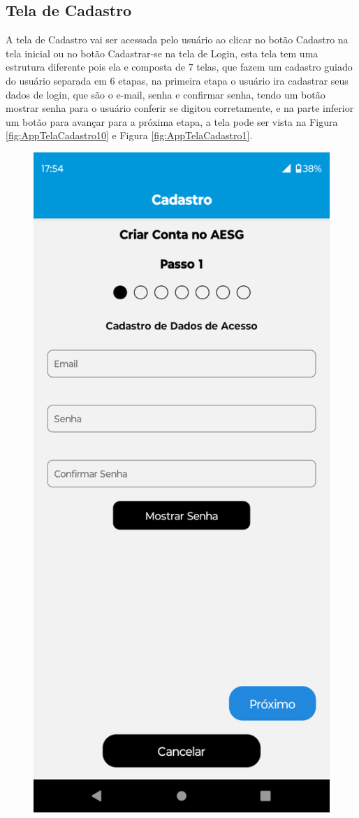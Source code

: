 \documentclass[
    12pt,                   %
    openright,              %
    oneside,                %
    a4paper,                %
    sumario=tradicional,    %
    english,                %
    brazil,                 %
    ]{abntex2}
\begin{document}
        \subsection{Tela de Cadastro}
            A tela de Cadastro vai ser acessada pelo usuário ao clicar no botão Cadastro na tela inicial ou no botão Cadastrar-se na tela de Login, esta tela tem uma estrutura diferente pois ela e composta de 7 telas, que fazem um cadastro guiado do usuário separada em 6 etapas, na primeira etapa o usuário ira cadastrar seus dados de login, que são o e-mail, senha e confirmar senha, tendo um botão mostrar senha para o usuário conferir se digitou corretamente, e na parte inferior um botão para avançar para a próxima etapa, a tela pode ser vista na Figura \ref{fig:AppTelaCadastro10} e Figura \ref{fig:AppTelaCadastro1}.
            \begin{figure}[!h]          
                \begin{minipage}{0.5\textwidth}
                    \centering
                    \includegraphics[width=0.8\linewidth]{Imagens/App Images User/AUCadastro10.png}

\end{minipage}
\end{figure}
\end{document}
